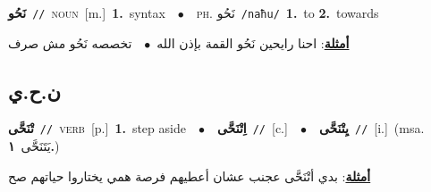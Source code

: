 \documentclass[10pt,a4paper,twoside]{article} %
\begin{document}
\begin{multicols}{2}
{\setlength\topsep{0pt}\textbf{\foreignlanguage{arabic}{نَحُو}}\ {\color{gray}\texttt{//}\color{black}}\ \textsc{noun}\ [m.]\ \textbf{1.}~syntax\ \ $\bullet$\ \ \textsc{ph.} \color{gray} \foreignlanguage{arabic}{نَحُو}\color{black}\ {\color{gray}\texttt{/{\sffamily naħu}/}\color{black}}\ \textbf{1.}~to  \textbf{2.}~towards\  \begin{flushright}\color{gray}\foreignlanguage{arabic}{\textbf{\underline{\foreignlanguage{arabic}{أمثلة}}}: احنا رايحين نَحُو القمة بإذن الله\ $\bullet$\ \  تخصصه نَحُو مش صرف}\end{flushright}\color{black}} \vspace{2mm}

\vspace{-3mm}
\subsection*{\color{blue}\foreignlanguage{arabic}{ن.ح.ي}\color{blue}{}} 

{\setlength\topsep{0pt}\textbf{\foreignlanguage{arabic}{تْنَحَّى}}\ {\color{gray}\texttt{//}\color{black}}\ \textsc{verb}\ [p.]\ \textbf{1.}~step aside\ \ $\bullet$\ \ \setlength\topsep{0pt}\textbf{\foreignlanguage{arabic}{اِتْنَحَّى}}\ {\color{gray}\texttt{//}\color{black}}\ [c.]\ \ $\bullet$\ \ \setlength\topsep{0pt}\textbf{\foreignlanguage{arabic}{يِتْنَحَّى}}\ {\color{gray}\texttt{//}\color{black}}\ [i.]\ \color{gray}(msa. \foreignlanguage{arabic}{يَتَنَحَّى}~\foreignlanguage{arabic}{\textbf{١.}})\color{black}\  \begin{flushright}\color{gray}\foreignlanguage{arabic}{\textbf{\underline{\foreignlanguage{arabic}{أمثلة}}}: بدي أتْنَحَّى عجنب عشان أعطيهم فرصة همي يختاروا حياتهم صح}\end{flushright}\color{black}} \vspace{2mm}


\end{multicols}
\end{document}
